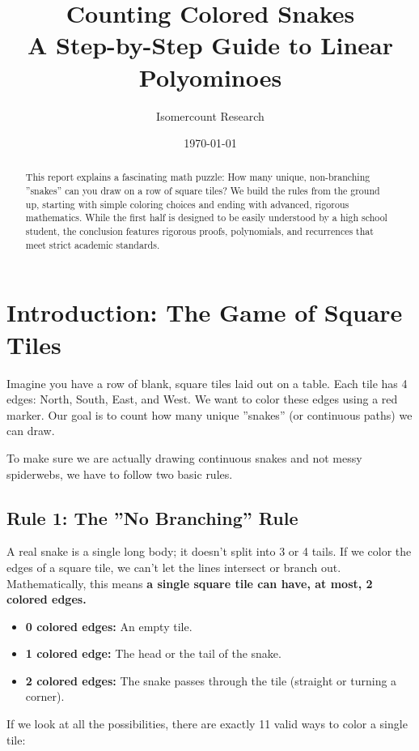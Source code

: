 \documentclass[12pt]{article}
\title{\Huge \textbf{Counting Colored Snakes}\\ \Large A Step-by-Step Guide to Linear Polyominoes}
\author{Isomercount Research}
\date{\today}
\begin{document}
\maketitle

\begin{abstract}
This report explains a fascinating math puzzle: How many unique, non-branching ''snakes'' can you draw on a row of square tiles? We build the rules from the ground up, starting with simple coloring choices and ending with advanced, rigorous mathematics. While the first half is designed to be easily understood by a high school student, the conclusion features rigorous proofs, polynomials, and recurrences that meet strict academic standards.
\end{abstract}

\section{Introduction: The Game of Square Tiles}

Imagine you have a row of blank, square tiles laid out on a table. Each tile has 4 edges: North, South, East, and West. We want to color these edges using a red marker. Our goal is to count how many unique ''snakes'' (or continuous paths) we can draw. 

To make sure we are actually drawing continuous snakes and not messy spiderwebs, we have to follow two basic rules.

\subsection*{Rule 1: The ''No Branching'' Rule}
A real snake is a single long body; it doesn't split into 3 or 4 tails. If we color the edges of a square tile, we can't let the lines intersect or branch out. 
Mathematically, this means \textbf{a single square tile can have, at most, 2 colored edges.}
\begin{itemize}
    \item \textbf{0 colored edges:} An empty tile.
    \item \textbf{1 colored edge:} The head or the tail of the snake.
    \item \textbf{2 colored edges:} The snake passes through the tile (straight or turning a corner).
\end{itemize}

If we look at all the possibilities, there are exactly 11 valid ways to color a single tile:
\end{document}
